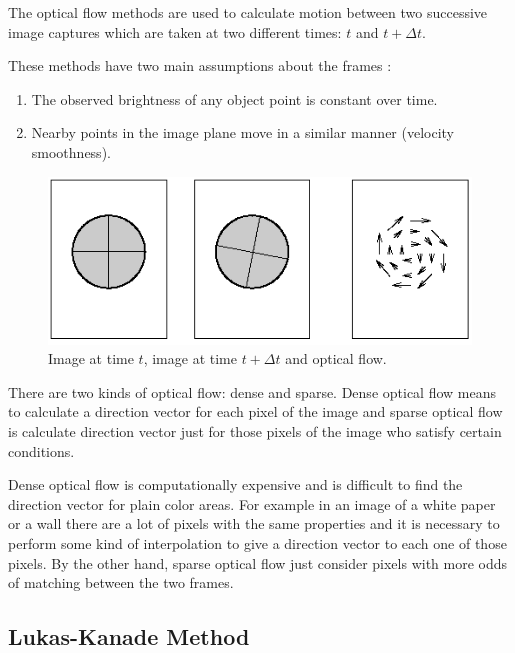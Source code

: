 The optical flow methods are used to calculate motion between two successive image captures which are taken
 at two different times: $t$ and $t + \Delta t$.

These methods have two main assumptions about the frames \cite{sonka2007}:

\begin{enumerate}
\item The observed brightness of any object point is constant over time.
\item Nearby points in the image plane move in a similar manner (velocity smoothness).
\end{enumerate}

\begin{figure}[h!]
\begin{center}
\includegraphics[scale=0.6]{images/oflow}
\caption{Image at time $t$, image at time $t + \Delta t$ and optical flow.}
\label{fig:oflow}
\end{center}
\end{figure}

There are two kinds of optical flow: dense and sparse. Dense optical flow means to calculate a direction vector for each pixel of the image and sparse optical flow is calculate direction vector just for those pixels of the image 
who satisfy certain conditions.

Dense optical flow is computationally expensive and is difficult to find the direction vector 
for plain color areas. For example in an image of a white paper or a wall
there are a lot of pixels with the same properties and it is necessary to perform some kind of interpolation to give a direction vector
 to each one of those pixels. 
By the other hand, sparse optical flow just consider pixels with more odds of matching between the two frames.

\subsection{Lukas-Kanade Method}
\label{sec:oflow}

